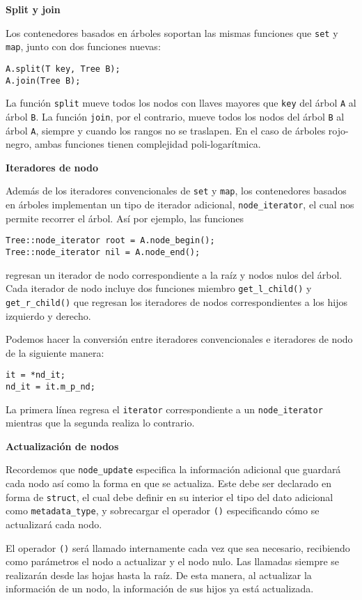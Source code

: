 \documentclass[10pt, letterpaper, twoside]{article}
\begin{document}
\textbf{Split y join}

Los contenedores basados en árboles soportan las mismas funciones que \texttt{set} y \texttt{map}, junto con dos funciones nuevas: 

\begin{lstlisting}
A.split(T key, Tree B);
A.join(Tree B);
\end{lstlisting}

La función \texttt{split} mueve todos los nodos con llaves mayores que \texttt{key} del árbol \texttt{A} al árbol \texttt{B}. La función \texttt{join}, por el contrario, mueve todos los nodos del árbol \texttt{B} al árbol \texttt{A}, siempre y cuando los rangos no se traslapen. En el caso de árboles rojo-negro, ambas funciones tienen complejidad poli-logarítmica.\medskip

\textbf{Iteradores de nodo}

Además de los iteradores convencionales de \texttt{set} y \texttt{map}, los contenedores basados en árboles implementan un tipo de iterador adicional, \texttt{node\_iterator}, el cual nos permite recorrer el árbol. Así por ejemplo, las funciones
\begin{lstlisting}
Tree::node_iterator root = A.node_begin();
Tree::node_iterator nil = A.node_end();
\end{lstlisting}
regresan un iterador de nodo correspondiente a la raíz y nodos nulos del árbol. Cada iterador de nodo incluye dos funciones miembro \texttt{get\_l\_child()} y \texttt{get\_r\_child()} que regresan los iteradores de nodos correspondientes a los hijos izquierdo y derecho.

Podemos hacer la conversión entre iteradores convencionales e iteradores de nodo de la siguiente manera:
\begin{lstlisting}
it = *nd_it;
nd_it = it.m_p_nd;
\end{lstlisting}
La primera línea regresa el \texttt{iterator} correspondiente a un \texttt{node\_iterator} mientras que la segunda realiza lo contrario.\medskip

\textbf{Actualización de nodos}

Recordemos que \texttt{node\_update} especifica la información adicional que guardará cada nodo así como la forma en que se actualiza. Este debe ser declarado en forma de \texttt{struct}, el cual debe definir en su interior el tipo del dato adicional como \texttt{metadata\_type}, y sobrecargar el operador \texttt{()} especificando cómo se actualizará cada nodo. 

El operador \texttt{()} será llamado internamente cada vez que sea necesario, recibiendo como parámetros el nodo a actualizar y el nodo nulo. Las llamadas siempre se realizarán desde las hojas hasta la raíz. De esta manera, al actualizar la información de un nodo, la información de sus hijos ya está actualizada.
\end{document}
